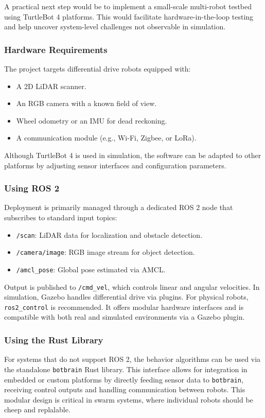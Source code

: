 A practical next step would be to implement a small-scale multi-robot testbed using TurtleBot 4 platforms. This would facilitate hardware-in-the-loop testing and help uncover system-level challenges not observable in simulation.

\subsubsection{Hardware Requirements}
The project targets differential drive robots equipped with:
\begin{itemize}
  \item A 2D LiDAR scanner.
  \item An RGB camera with a known field of view.
  \item Wheel odometry or an IMU for dead reckoning.
  \item A communication module (e.g., Wi-Fi, Zigbee, or LoRa).
\end{itemize}
Although TurtleBot 4 is used in simulation, the software can be adapted to other platforms by adjusting sensor interfaces and configuration parameters.

\subsubsection{Using ROS 2}
Deployment is primarily managed through a dedicated ROS 2 node that subscribes to standard input topics:
\begin{itemize}
  \item \texttt{/scan}: LiDAR data for localization and obstacle detection.
  \item \texttt{/camera/image}: RGB image stream for object detection.
  \item \texttt{/amcl\_pose}: Global pose estimated via AMCL.
\end{itemize}

Output is published to \texttt{/cmd\_vel}, which controls linear and angular velocities. In simulation, Gazebo handles differential drive via plugins. For physical robots, \texttt{ros2\_control} \cite{ros2-control} is recommended. It offers modular hardware interfaces and is compatible with both real and simulated environments via a Gazebo plugin.

\subsubsection{Using the Rust Library}
For systems that do not support ROS 2, the behavior algorithms can be used via the standalone \texttt{botbrain} Rust library. This interface allows for integration in embedded or custom platforms by directly feeding sensor data to \texttt{botbrain}, receiving control outputs and handling communication between robots. This modular design is critical in swarm systems, where individual robots should be cheep and replalable.

